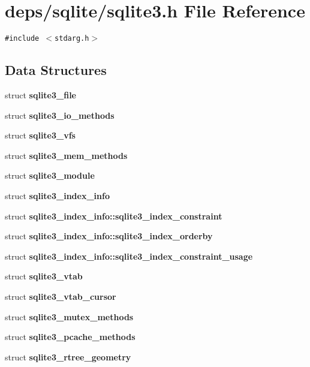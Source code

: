\section{deps/sqlite/sqlite3.h File Reference}
\label{sqlite3_8h}
{\tt \#include $<$stdarg.h$>$}\par
\subsection*{Data Structures}
\begin{CompactItemize}
\item 
struct \bf{sqlite3\_\-file}
\item 
struct \bf{sqlite3\_\-io\_\-methods}
\item 
struct \bf{sqlite3\_\-vfs}
\item 
struct \bf{sqlite3\_\-mem\_\-methods}
\item 
struct \bf{sqlite3\_\-module}
\item 
struct \bf{sqlite3\_\-index\_\-info}
\item 
struct \bf{sqlite3\_\-index\_\-info::sqlite3\_\-index\_\-constraint}
\item 
struct \bf{sqlite3\_\-index\_\-info::sqlite3\_\-index\_\-orderby}
\item 
struct \bf{sqlite3\_\-index\_\-info::sqlite3\_\-index\_\-constraint\_\-usage}
\item 
struct \bf{sqlite3\_\-vtab}
\item 
struct \bf{sqlite3\_\-vtab\_\-cursor}
\item 
struct \bf{sqlite3\_\-mutex\_\-methods}
\item 
struct \bf{sqlite3\_\-pcache\_\-methods}
\item 
struct \bf{sqlite3\_\-rtree\_\-geometry}
\end{CompactItemize}
